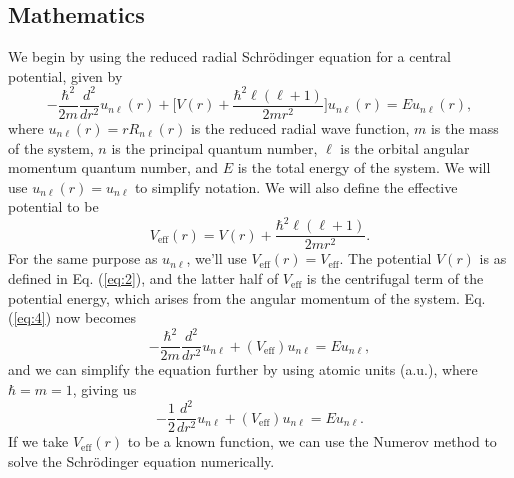 \documentclass[%
 reprint,
nofootinbib,
 amsmath,amssymb,
 aps,
floatfix,
]{revtex4-2}
\begin{document}
\subsection{\label{subsec:math}Mathematics}
{
  We begin by using the reduced radial Schr\"odinger equation \cite{griffithsqm2} for a central potential, given by
  \begin{equation}
    -\frac{\hbar^2}{2m} \frac{d^2}{dr^2} u_{n\ell}(r) + \bigg[V(r) + \frac{\hbar^2 \ell(\ell + 1)}{2 m r^2} \bigg] u_{n\ell}(r) = E u_{n\ell}(r), \label{eq:3}
  \end{equation}
  where $u_{n\ell}(r) = r R_{n\ell}(r)$ is the reduced radial wave function, $m$ is the mass of the system, $n$ is the principal quantum number, $\ell$ is the orbital angular momentum quantum number, and $E$ is the total energy of the system. 
  We will use $u_{n\ell}(r) = u_{n\ell}$ to simplify notation. 
  We will also define the effective potential to be
  \begin{equation}
    V_{\text{eff}}(r) = V(r) + \frac{\hbar^2 \ell(\ell + 1)}{2 m r^2}. \label{eq:4}
  \end{equation}
  For the same purpose as $u_{n\ell}$, we'll use $V_{\text{eff}} (r) = V_{\text{eff}}$. 
  The potential $V(r)$ is as defined in Eq. (\ref{eq:2}), and the latter half of $V_{\text{eff}}$ is the centrifugal term of the potential energy, which arises from the angular momentum of the system. 
  Eq. (\ref{eq:4}) now becomes 
  \begin{equation}
    -\frac{\hbar^2}{2m} \frac{d^2}{dr^2} u_{n\ell} + (V_{\text{eff}}) u_{n\ell} = E u_{n\ell}, \label{eq:5}
  \end{equation}
  and we can simplify the equation further by using atomic units (a.u.), where $\hbar = m = 1$, giving us
  \begin{equation}
    -\frac{1}{2} \frac{d^2}{dr^2} u_{n\ell} + (V_{\text{eff}}) u_{n\ell} = E u_{n\ell}. \label{eq:6}
  \end{equation}
  If we take $V_{\text{eff}}(r)$ to be a known function, we can use the Numerov method to solve the Schr\"odinger equation numerically.

}
\end{document}
